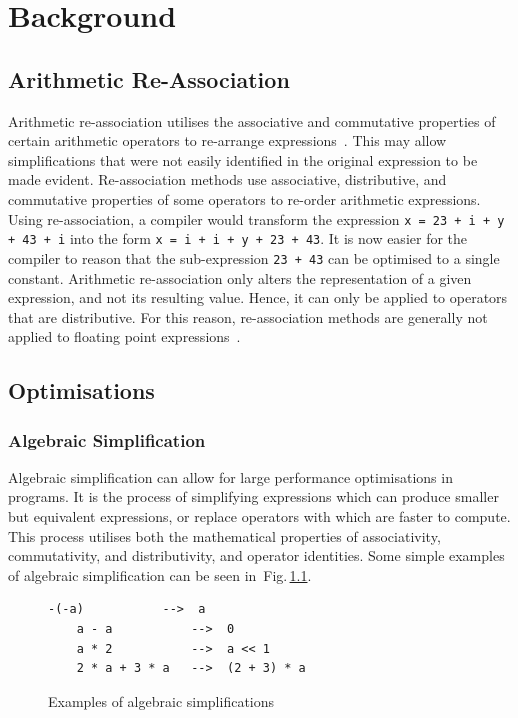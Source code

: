 \documentclass[12pt,openany,a4paper]{book}
\newcommand{\fig}[1]  {Fig.\,\ref{#1}}		%
\begin{document}
\chapter{Background}
\label{bg}

\section{Arithmetic Re-Association}
\label{ara}

Arithmetic re-association utilises the associative and
commutative properties of certain arithmetic operators to re-arrange expressions~\cite{redund}. 
This may allow simplifications that were not easily identified in the original 
expression to be made evident. Re-association methods use associative,
distributive, and commutative properties of some operators to re-order arithmetic
expressions.
Using re-association, a compiler would transform the expression
\verb|x = 23 + i + y + 43 + i| into the form \verb|x = i + i + y + 23 + 43|. It
is now easier for the compiler to reason that the sub-expression \verb|23 + 43|
can be optimised to a single constant.
Arithmetic re-association only alters the representation of a given expression,
and not its resulting value. Hence, it can only be applied to operators that
are distributive. For this reason, re-association methods are generally not
applied to floating point expressions~\cite{floats}.

\section{Optimisations}
\label{opt}

\subsection{Algebraic Simplification}
\label{as}

Algebraic simplification can allow for large performance optimisations in
programs. It is the process of simplifying expressions which can produce smaller
but equivalent expressions, or replace operators with which are faster to compute. 
This process utilises both the mathematical properties of associativity, commutativity, 
and distributivity, and operator identities. Some simple examples of algebraic
simplification can be seen in~\fig{simp}. 

\begin{figure}[htbp]
    \hspace{0.25\textwidth}
    \begin{minipage}[c]{0.5\linewidth}
    \begin{lstlisting}[frame=single, basicstyle=\ttfamily\small, tabsize=1, columns=fullflexible]
    -(-a)           -->  a
    a - a           -->  0
    a * 2           -->  a << 1
    2 * a + 3 * a   -->  (2 + 3) * a
    \end{lstlisting}
    \end{minipage}
    \caption{Examples of algebraic simplifications}
    \label{simp}
\end{figure}
\end{document}
